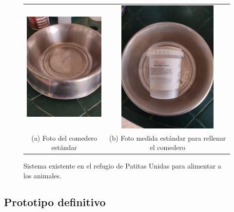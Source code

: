 \documentclass[12pt]{article}
\begin{document}
	\begin{figure}[h!]
		\begin{center}
			\begin{tabular}{cc}
				\includegraphics[width=50mm]{img/comedero_refugio_1.jpg} &   \includegraphics[width=50mm]{img/comedero_refugio_2.jpg} \\
				(a) Foto del comedero estándar & (b) Foto medida estándar para rellenar el comedero\\[6pt]
			\end{tabular}
			\caption{Sistema existente en el refugio de Patitas Unidas para alimentar a los animales. }
			\label{fig: sistema comedero refugio.}
		\end{center}
	\end{figure}

	\pagebreak
	
	\subsection[Prototipo definitivo]{Prototipo definitivo}
	
\end{document}
